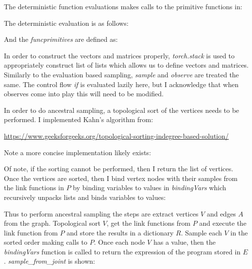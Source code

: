 \documentclass[]{article}
\begin{document}


The deterministic function evaluations makes calls to the primitive functions in:

The deterministic evaluation is as follows:


And the \emph{funcprimitives} are defined as:


In order to construct the vectors and matrices properly, \emph{torch.stack} is used to appropriately construct list of lists which allows us to define vectors and matrices. Similarly to the evaluation based sampling, \emph{sample} and \emph{observe} are treated the same. The control flow \emph{if} is evaluated lazily here, but I acknowledge that when observes come into play this will need to be modified.

In order to do ancestral sampling, a topological sort of the vertices needs to be performed. I implemented Kahn's algorithm from:
\begin{center}
	\url{https://www.geeksforgeeks.org/topological-sorting-indegree-based-solution/} 
\end{center} 
Note a more concise implementation likely exists:

Of note, if the sorting cannot be performed, then I return the list of vertices.
Once the vertices are sorted, then I bind vertex nodes with their samples from the link functions in $P$ by binding variables to values in \emph{bindingVars} which recursively unpacks lists and binds variables to values:
 

Thus to perform ancestral sampling the steps are extract vertices $V$ and edges $A$ from the graph. Topological sort $V$, get the link functions from $P$ and execute the link function from $P$ and store the results in a dictionary $R$. Sample each $V$ in the sorted order making calls to $P$. Once each node $V$ has a value, then the \emph{bindingVars} function is called to return the expression of the program stored in $E$. \emph{sample\_from\_joint} is shown:
  
\newpage
\end{document}
